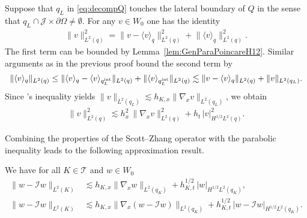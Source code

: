 \documentclass{amsart}
\providecommand{\tria}{\mathcal{T}}
\newcommand{\cJ}{\mathcal J}
\begin{document}
\begin{remark}[Boundary]\label{rem:BoundaryPoincare}
Suppose that $q_L$ in \eqref{eq:decompQ} touches the lateral boundary of $Q$ in the sense that $q_L \cap \cJ \times \partial \Omega \neq \emptyset$. For any $v\in W_0$ one has the identity
\begin{align*}
\lVert v \rVert^2_{L^2(q)} = \lVert v - \langle v\rangle_q \rVert^2_{L^2(q)} + \lVert \langle v\rangle_q \rVert_{L^2(q)}^2.
\end{align*}
The first term can be bounded by Lemma~\ref{lem:GenParaPoincareH12}. Similar arguments as in the previous proof bound the second term by
\begin{align*}
\lVert \langle v\rangle_q \rVert_{L^2(q)} \leq \lVert \langle v\rangle_q - \langle v\rangle_{q_L^\textup{int}} \rVert_{L^2(q)} + \lVert \langle v\rangle_{q_L^\textup{int}} \rVert_{L^2(q)} \lesssim \lVert v - \langle v\rangle_q \rVert_{L^2(q)} + \lVert v \rVert_{L^2(q_L)}.
\end{align*}
Since \Poincare's inequality yields $\lVert v \rVert_{L^2(q_L)} \lesssim h_{K,x} \lVert \nabla_x v\rVert_{L^2(q_L)}$, we obtain
\begin{align*}
\lVert v  \rVert^2_{L^2(q)} \lesssim  h_x^2 \, \lVert \nabla_x v \rVert_{L^2(q)}^2 + h_t\, \lvert v \rvert^2_{H^{1/2}L^2(q)}.
\end{align*}
\end{remark}
%
Combining the properties of the Scott--Zhang operator with the parabolic \Poincare{} inequality leads to the following approximation result. 
%
\begin{lemma}\label{lem:locApx}
We have for all $K\in \tria$ 
and $w \in W_0$
\begin{align*}
\lVert w - \mathcal{I} w \rVert_{L^2(K)} &\lesssim h_{K,x} \lVert \nabla_x w \rVert_{L^2(q_K)} + h_{K,t}^{1/2}\, \lvert w \rvert_{H^{1/2}L^2(q_K)},\\
\lVert w - \mathcal{I} w \rVert_{L^2(K)} &\lesssim h_{K,x} \lVert \nabla_x (w - \mathcal{I} w) \rVert_{L^2(q_K)} + h_{K,t}^{1/2}\, \lvert w- \mathcal{I} w \rvert_{H^{1/2}L^2(q_K)}.
\end{align*}
\end{lemma}
\end{document}
